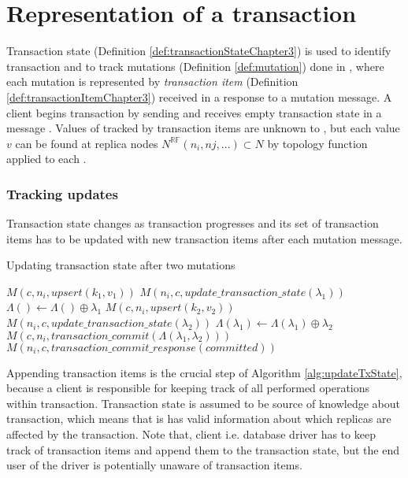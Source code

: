 
\section{Representation of a transaction}
Transaction state (Definition \ref{def:transactionStateChapter3}) is used to identify transaction \transaction and to
 track mutations (Definition \ref{def:mutation}) done in \transaction, where each mutation is represented by
 \emph{transaction item} \txItem (Definition \ref{def:transactionItemChapter3}) received in a response to a mutation message. A client \client begins transaction by sending \beginTransactionMessage and receives empty transaction state \txState in a message  \initialTxStateMessage.
Values of \mutationsFull tracked by transaction items \txItems are unknown to \txItems, but each value $v$ can be found at replica nodes
$N^{\mathbb{RF}}(n_{i},n{j},...)\subset \mathit{N}$ by topology function \topology applied to each \txItem.

\subsubsection{Tracking updates}
Transaction state \txState changes as transaction \transaction progresses and its set of transaction items has to be updated with new transaction items after each mutation message. 

\begin{algorithm}
  \caption{Updating transaction state after two mutations}
  \label{alg:updateTxState}
  \begin{algorithmic}       
    \State \beginTransactionMessage
    \State \initialTxStateMessage
    \State $\mathit{M}(c, n_{i}, \mathit{upsert(k_{1},v_{1})})$
    \State $\mathit{M}(n_{i}, c, \mathit{update\_transaction\_state}(\lambda_{1}))$
    \State $\Lambda() \gets \Lambda() \oplus \lambda_{1}$
    \State $\mathit{M}(c, n_{i}, \mathit{upsert(k_{2},v_{2})})$
    \State $\mathit{M}(n_{i}, c, \mathit{update\_transaction\_state}(\lambda_{2}))$
    \State $\Lambda(\lambda_{1}) \gets \Lambda(\lambda_{1}) \oplus \lambda_{2}$
    \State $\mathit{M}(c, n_{i}, \mathit{transaction\_commit}(\Lambda(\lambda_{1}, \lambda_{2})))$
    \State $\mathit{M}(n_{i}, c, \mathit{transaction\_commit\_response}(committed))$    
  \end{algorithmic}
\end{algorithm}


Appending transaction items is the crucial step of Algorithm \ref{alg:updateTxState}, because a client is responsible for keeping track of all performed operations within transaction. Transaction state is assumed to be source of knowledge about transaction, which means that is has valid information about which replicas are affected by the transaction.
Note that, client i.e. database driver has to keep track of transaction items and append them to the transaction state, but the end user of the driver is potentially unaware of transaction items.

